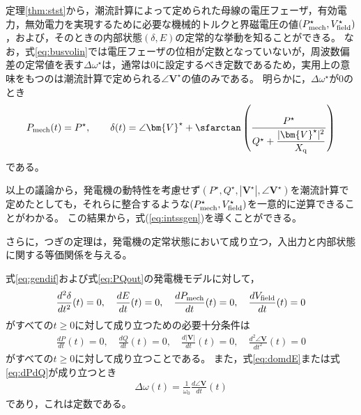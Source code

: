 \documentclass[tombow,dvipdfmx]{corona-a5-1.1}
\begin{document}
定理\ref{thm:stst}から，潮流計算によって定められた母線の電圧フェーザ，有効電力，無効電力を実現するために必要な機械的トルクと界磁電圧の値$(P_{\rm mech}^{\star},V_{\rm field}^{\star})$，および，そのときの内部状態$(\delta,E)$の定常的な挙動を知ることができる。
なお，式\ref{eq:busvolin}では電圧フェーザの位相が定数となっていないが，周波数偏差の定常値を表す$\Delta \omega^{\star}$は，通常は0に設定するべき定数であるため，実用上の意味をもつのは潮流計算で定められる$\angle \bm{V}^{\star}$の値のみである。
明らかに，$\Delta \omega^{\star}$が0のとき
\begin{align*}
P_{{\rm mech}}(t) =    P^{\star},\qquad
\delta (t)  = \angle \bm{V}^{\star}
+ \sfarctan \left( \frac{P^{\star}}{Q^{\star} + \frac{ |\bm{V}^{\star}|^2}{X_{\rm q}} } \right)
\end{align*}
である。

以上の議論から，発電機の動特性を考慮せず$(P^{\star},Q^{\star},|\bm{V}^{\star}|,\angle \bm{V}^{\star})$を潮流計算で定めたとしても，それらに整合するような$(P_{\rm mech}^{\star},V_{\rm field}^{\star})$を一意的に逆算できることがわかる。
この結果から，式(\ref{eq:intssgen})を導くことができる。

さらに，つぎの定理は，発電機の定常状態において成り立つ，入出力と内部状態に関する等価関係を与える。

\begin{定理}[発電機の入出力と内部状態に関する等価関係]
\label{thm:outst}
式\ref{eq:gendif}および式\ref{eq:PQout}の発電機モデルに対して，
\begin{align}\label{eq:domdE}
\frac{d^2 \delta}{dt^2}(t)=0
,\quad
\frac{dE}{dt}(t)=0
,\quad
\frac{d P_{\rm mech}}{dt}(t)=0
,\quad
\frac{d V_{\rm field}}{dt}(t)=0
\end{align}
がすべての$t\geq0$に対して成り立つための必要十分条件は
\begin{align}\label{eq:dPdQ}
\frac{dP}{dt}(t)=0
,\quad
\frac{dQ}{dt}(t)=0
,\quad
\frac{d|\bm{V}|}{dt}(t)=0
,\quad
\frac{d^2 \angle \bm{V}}{dt^2}(t)=0
\end{align}
がすべての$t\geq0$に対して成り立つことである。
また，式\ref{eq:domdE}または式\ref{eq:dPdQ}が成り立つとき
\begin{align}\label{eq:frer}
\Delta \omega(t)= \frac{1}{\omega_0}\frac{d \angle \bm{V}}{dt}(t)
\end{align}
であり，これは定数である。
\end{定理}
\end{document}
